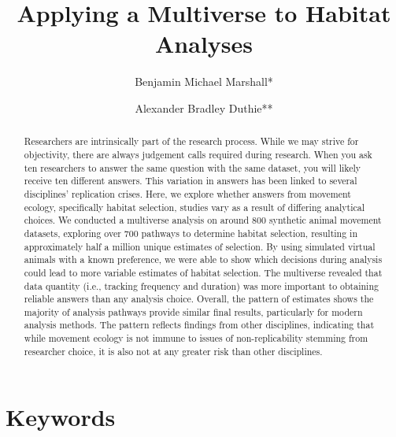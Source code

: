 \documentclass[10pt,a4paper]{article}
\begin{document}
\pagestyle{fancy}

\title{Applying a Multiverse to Habitat Analyses}
\author[1]{Benjamin Michael Marshall*}
\author[1]{Alexander Bradley Duthie**}


\maketitle
\thispagestyle{fancy}

\begin{abstract}

Researchers are intrinsically part of the research process. While we may strive for objectivity, there are always judgement calls required during research. When you ask ten researchers to answer the same question with the same dataset, you will likely receive ten different answers. This variation in answers has been linked to several disciplines' replication crises. Here, we explore whether answers from movement ecology, specifically habitat selection, studies vary as a result of differing analytical choices. We conducted a multiverse analysis on around 800 synthetic animal movement datasets, exploring over 700 pathways to determine habitat selection, resulting in approximately half a million unique estimates of selection. By using simulated virtual animals with a known preference, we were able to show which decisions during analysis could lead to more variable estimates of habitat selection. The multiverse revealed that data quantity (i.e., tracking frequency and duration) was more important to obtaining reliable answers than any analysis choice. Overall, the pattern of estimates shows the majority of analysis pathways provide similar final results, particularly for modern analysis methods. The pattern reflects findings from other disciplines, indicating that while movement ecology is not immune to issues of non-replicability stemming from researcher choice, it is also not at any greater risk than other disciplines.

\end{abstract}

\section*{Keywords}
\end{document}
